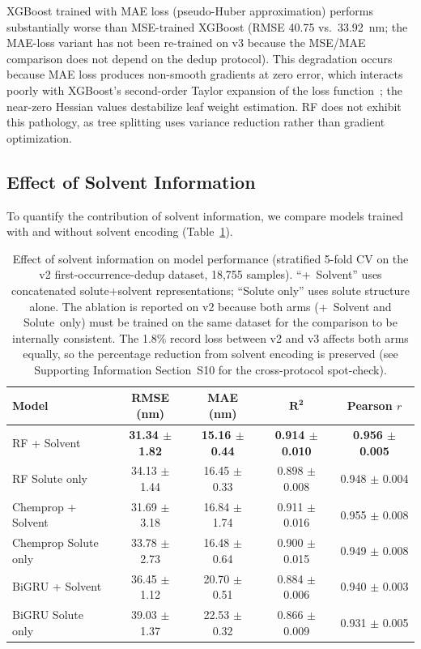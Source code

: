 \documentclass[journal=jcisd8,manuscript=article]{achemso}
\begin{document}
XGBoost trained with MAE loss (pseudo-Huber approximation) performs substantially worse than MSE-trained XGBoost (RMSE 40.75 vs.\ 33.92~nm; the MAE-loss variant has not been re-trained on v3 because the MSE/MAE comparison does not depend on the dedup protocol).
This degradation occurs because MAE loss produces non-smooth gradients at zero error, which interacts poorly with XGBoost's second-order Taylor expansion of the loss function~\cite{chen2016xgboost}; the near-zero Hessian values destabilize leaf weight estimation.
RF does not exhibit this pathology, as tree splitting uses variance reduction rather than gradient optimization.


\subsection{Effect of Solvent Information}
\label{sec:solvent_ablation}

To quantify the contribution of solvent information, we compare models trained with and without solvent encoding (Table~\ref{tab:solvent_ablation}).

\begin{table}[htbp]
\centering
\caption{Effect of solvent information on model performance (stratified 5-fold CV on the v2 first-occurrence-dedup dataset, 18{,}755 samples). ``+~Solvent'' uses concatenated solute+solvent representations; ``Solute only'' uses solute structure alone. The ablation is reported on v2 because both arms (+~Solvent and Solute~only) must be trained on the same dataset for the comparison to be internally consistent. The 1.8\% record loss between v2 and v3 affects both arms equally, so the percentage reduction from solvent encoding is preserved (see Supporting Information Section~S10 for the cross-protocol spot-check).}
\label{tab:solvent_ablation}
\begin{tabular}{lcccc}
\toprule
\textbf{Model} & \textbf{RMSE (nm)} & \textbf{MAE (nm)} & $\boldsymbol{R^2}$ & \textbf{Pearson $r$} \\
\midrule
RF + Solvent & \textbf{31.34 $\pm$ 1.82} & \textbf{15.16 $\pm$ 0.44} & \textbf{0.914 $\pm$ 0.010} & \textbf{0.956 $\pm$ 0.005} \\
RF Solute only & 34.13 $\pm$ 1.44 & 16.45 $\pm$ 0.33 & 0.898 $\pm$ 0.008 & 0.948 $\pm$ 0.004 \\
\midrule
Chemprop + Solvent & 31.69 $\pm$ 3.18 & 16.84 $\pm$ 1.74 & 0.911 $\pm$ 0.016 & 0.955 $\pm$ 0.008 \\
Chemprop Solute only & 33.78 $\pm$ 2.73 & 16.48 $\pm$ 0.64 & 0.900 $\pm$ 0.015 & 0.949 $\pm$ 0.008 \\
\midrule
BiGRU + Solvent & 36.45 $\pm$ 1.12 & 20.70 $\pm$ 0.51 & 0.884 $\pm$ 0.006 & 0.940 $\pm$ 0.003 \\
BiGRU Solute only & 39.03 $\pm$ 1.37 & 22.53 $\pm$ 0.32 & 0.866 $\pm$ 0.009 & 0.931 $\pm$ 0.005 \\
\bottomrule
\end{tabular}
\end{table}
\end{document}
